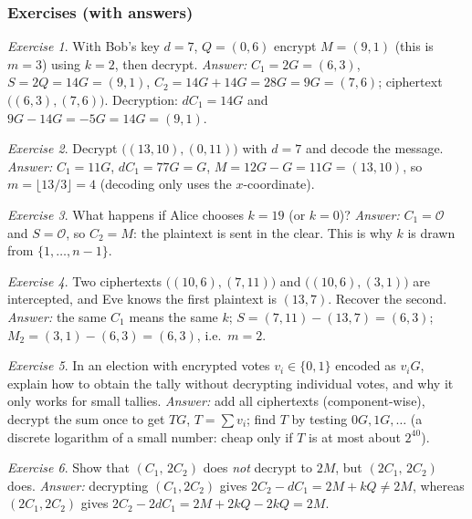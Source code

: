 \documentclass[11pt,a4paper,oneside]{book}
\theoremstyle{plain}
\theoremstyle{definition}
\theoremstyle{remark}
\newtheorem{exercise}{Exercise}[chapter]
\newcommand{\Oinf}{\mathcal{O}}
\begin{document}
\subsubsection*{Exercises (with answers)}

\begin{exercise}
With Bob's key $d=7$, $Q=(0,6)$ encrypt $M=(9,1)$ (this is $m=3$) using $k=2$, then decrypt. \emph{Answer:} $C_1=2G=(6,3)$, $S=2Q=14G=(9,1)$, $C_2=14G+14G=28G=9G=(7,6)$; ciphertext $\big((6,3),(7,6)\big)$. Decryption: $dC_1=14G$ and $9G-14G=-5G=14G=(9,1)$. 
\end{exercise}

\begin{exercise}
Decrypt $\big((13,10),(0,11)\big)$ with $d=7$ and decode the message. \emph{Answer:} $C_1=11G$, $dC_1=77G=G$, $M=12G-G=11G=(13,10)$, so $m=\lfloor13/3\rfloor=4$ (decoding only uses the $x$-coordinate).
\end{exercise}

\begin{exercise}
What happens if Alice chooses $k=19$ (or $k=0$)? \emph{Answer:} $C_1=\Oinf$ and $S=\Oinf$, so $C_2=M$: the plaintext is sent in the clear. This is why $k$ is drawn from $\{1,\dots,n-1\}$.
\end{exercise}

\begin{exercise}
Two ciphertexts $\big((10,6),(7,11)\big)$ and $\big((10,6),(3,1)\big)$ are intercepted, and Eve knows the first plaintext is $(13,7)$. Recover the second. \emph{Answer:} the same $C_1$ means the same $k$; $S=(7,11)-(13,7)=(6,3)$; $M_2=(3,1)-(6,3)=(6,3)$, i.e.\ $m=2$.
\end{exercise}

\begin{exercise}
In an election with encrypted votes $v_i\in\{0,1\}$ encoded as $v_iG$, explain how to obtain the tally without decrypting individual votes, and why it only works for small tallies. \emph{Answer:} add all ciphertexts (component-wise), decrypt the sum once to get $TG$, $T=\sum v_i$; find $T$ by testing $0G,1G,\dots$ (a discrete logarithm of a small number: cheap only if $T$ is at most about $2^{40}$).
\end{exercise}

\begin{exercise}
Show that $(C_1,\,2C_2)$ does \emph{not} decrypt to $2M$, but $(2C_1,\,2C_2)$ does. \emph{Answer:} decrypting $(C_1,2C_2)$ gives $2C_2-dC_1=2M+kQ\ne2M$, whereas $(2C_1,2C_2)$ gives $2C_2-2dC_1=2M+2kQ-2kQ=2M$.
\end{exercise}
\end{document}
